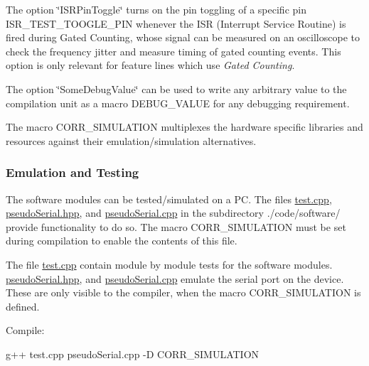 \begin{DoxyItemize}
\item The option {\ttfamily \char`\"{}\+I\+S\+R\+Pin\+Toggle\char`\"{}} turns on the pin toggling of a specific pin {\ttfamily I\+S\+R\+\_\+\+T\+E\+S\+T\+\_\+\+T\+O\+O\+G\+L\+E\+\_\+\+P\+IN} whenever the I\+SR (Interrupt Service Routine) is fired during Gated Counting, whose signal can be measured on an oscilloscope to check the frequency jitter and measure timing of gated counting events. This option is only relevant for feature lines which use {\itshape Gated Counting}.
\item The option {\ttfamily \char`\"{}\+Some\+Debug\+Value\char`\"{}} can be used to write any arbitrary value to the compilation unit as a macro {\ttfamily D\+E\+B\+U\+G\+\_\+\+V\+A\+L\+UE} for any debugging requirement.
\item The macro {\ttfamily C\+O\+R\+R\+\_\+\+S\+I\+M\+U\+L\+A\+T\+I\+ON} multiplexes the hardware specific libraries and resources against their emulation/simulation alternatives.
\end{DoxyItemize}

\subsubsection*{Emulation and Testing}


\begin{DoxyItemize}
\item The software modules can be tested/simulated on a PC. The files {\ttfamily \hyperlink{test_8cpp}{test.\+cpp}}, {\ttfamily \hyperlink{pseudoSerial_8hpp}{pseudo\+Serial.\+hpp}}, and {\ttfamily \hyperlink{pseudoSerial_8cpp}{pseudo\+Serial.\+cpp}} in the subdirectory {\ttfamily ./code/software/} provide functionality to do so. The macro {\ttfamily C\+O\+R\+R\+\_\+\+S\+I\+M\+U\+L\+A\+T\+I\+ON} must be set during compilation to enable the contents of this file.
\item The file {\ttfamily \hyperlink{test_8cpp}{test.\+cpp}} contain module by module tests for the software modules. {\ttfamily \hyperlink{pseudoSerial_8hpp}{pseudo\+Serial.\+hpp}}, and {\ttfamily \hyperlink{pseudoSerial_8cpp}{pseudo\+Serial.\+cpp}} emulate the serial port on the device. These are only visible to the compiler, when the macro {\ttfamily C\+O\+R\+R\+\_\+\+S\+I\+M\+U\+L\+A\+T\+I\+ON} is defined.

Compile\+:
\end{DoxyItemize}


\begin{DoxyCode}
g++ test.cpp pseudoSerial.cpp -D CORR\_SIMULATION
\end{DoxyCode}



